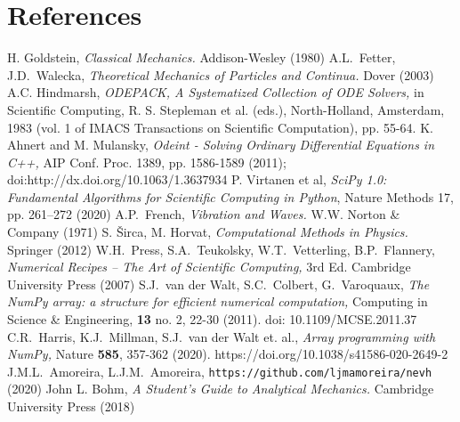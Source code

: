 \documentclass{iopart}
\begin{document}
\section*{References}
\begin{thebibliography}{99}
   H. Goldstein, \textsl{Classical Mechanics.} Addison-Wesley
  (1980)
%
    A.L.~Fetter, J.D.~Walecka,
    \textsl{Theoretical Mechanics of Particles and Continua.}
    Dover (2003)
%
  A.C. Hindmarsh, \textsl{ODEPACK, A Systematized Collection of ODE Solvers,} in
    Scientific Com\-puting, R. S. Stepleman et al. (eds.), North-Holland,
    Amsterdam, 1983 (vol. 1 of IMACS Transactions on Scientific Computation),
    pp. 55-64. 
%
  K. Ahnert and M. Mulansky, \textsl{Odeint - Solving Ordinary Differential
  Equations in C++,} AIP Conf. Proc. 1389, pp. 1586-1589 (2011);
doi:http://dx.doi.org/10.1063/1.3637934
%
  P. Virtanen et al, \textsl{SciPy 1.0: Fundamental Algorithms for Scientific
  Computing in Python}, Nature Methods 17, pp. 261--272 (2020)
%
   A.P.~French, \textsl{Vibration and Waves.} W.W. Norton \&
  Company (1971)
%
   S. \v{S}irca, M. Horvat, \textsl{Computational Methods in
  Physics.} Springer (2012)
%
   W.H.~Press, S.A.~Teukolsky, W.T.~Vetterling, B.P.~Flannery,
  \textsl{Numerical Recipes -- The Art of Scientific Computing,} 3rd Ed.
  Cambridge University Press (2007)
%
   S.J.~van der Walt, S.C.~Colbert, G.~Varoquaux,
  \textsl{The NumPy array: a structure for efficient numerical computation,}
  Computing in Science \& Engineering, \textbf{13} no. 2, 22-30 (2011).
  doi: 10.1109/MCSE.2011.37
%
   C.R.~Harris, K.J.~Millman, S.J.~van der Walt et. al.,
  \textsl{Array programming with NumPy,} Nature \textbf{585}, 357-362 (2020).
  https://doi.org/10.1038/s41586-020-2649-2
%
   J.M.L.~Amoreira, L.J.M.~Amoreira,
  \texttt{https://github.com/ljmamoreira/nevh} (2020)
%
   John L. Bohm, \textsl{A Student's Guide to Analytical
  Mechanics.} Cambridge University Press (2018)

\end{thebibliography}
\end{document}
